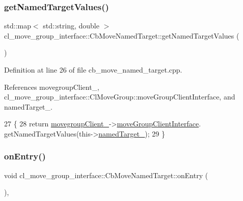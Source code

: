 \subsubsection{\texorpdfstring{get\+Named\+Target\+Values()}{getNamedTargetValues()}}
{\footnotesize\ttfamily std\+::map$<$ std\+::string, double $>$ cl\+\_\+move\+\_\+group\+\_\+interface\+::\+Cb\+Move\+Named\+Target\+::get\+Named\+Target\+Values (\begin{DoxyParamCaption}{ }\end{DoxyParamCaption})}



Definition at line 26 of file cb\+\_\+move\+\_\+named\+\_\+target.\+cpp.



References movegroup\+Client\+\_\+, cl\+\_\+move\+\_\+group\+\_\+interface\+::\+Cl\+Move\+Group\+::move\+Group\+Client\+Interface, and named\+Target\+\_\+.


\begin{DoxyCode}
27 \{
28     \textcolor{keywordflow}{return} \hyperlink{classcl__move__group__interface_1_1CbMoveNamedTarget_ab19a253b419bdbf3ec4b4b45a4198a65}{movegroupClient\_}->\hyperlink{classcl__move__group__interface_1_1ClMoveGroup_a92922ea689e4e1b7b91512c56629c95b}{moveGroupClientInterface}.
      getNamedTargetValues(this->\hyperlink{classcl__move__group__interface_1_1CbMoveNamedTarget_a597a5afdcba0359aaa8d3f923fdfe133}{namedTarget\_});
29 \}
\end{DoxyCode}
\mbox{\label{classcl__move__group__interface_1_1CbMoveNamedTarget_ab212edda280e896977d7ac567e4c1b29}} 
\subsubsection{\texorpdfstring{on\+Entry()}{onEntry()}}
{\footnotesize\ttfamily void cl\+\_\+move\+\_\+group\+\_\+interface\+::\+Cb\+Move\+Named\+Target\+::on\+Entry (\begin{DoxyParamCaption}{ }\end{DoxyParamCaption})\hspace{0.3cm}{\ttfamily [override]}, {\ttfamily [virtual]}}



